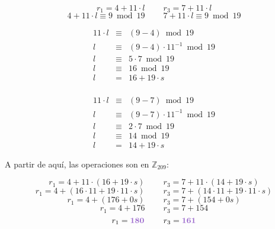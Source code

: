 \documentclass[10pt,spanish]{article}
\begin{document}
\begin{description}
    \begin{displaymath}
        r_1 = 4 + 11 \cdot l \qquad\ r_3 = 7 + 11 \cdot l
    \end{displaymath}
    \begin{displaymath}
        4 + 11 \cdot l \equiv 9 \bmod 19 \qquad\ 7 + 11 \cdot l \equiv 9 \bmod 19
    \end{displaymath}

    \begin{minipage}{0.5\textwidth}
    \begin{displaymath}
    \begin{matrix}
    11 \cdot l & \equiv & (9 - 4) \bmod 19 \\
    l & \equiv & (9 - 4) \cdot 11^{-1} \bmod 19\\
    l & \equiv & 5 \cdot 7 \bmod 19\\
    l & \equiv & 16 \bmod 19\\
    l & = & 16 + 19 \cdot s \\
    \end{matrix}     
    \end{displaymath}
    \end{minipage}
    \begin{minipage}{0.5\textwidth}
    \begin{displaymath}
    \begin{matrix}
    11 \cdot l & \equiv & (9 - 7) \bmod 19 \\
    l & \equiv & (9 - 7) \cdot 11^{-1} \bmod 19\\
    l & \equiv & 2 \cdot 7 \bmod 19\\
    l & \equiv & 14 \bmod 19\\
    l & = & 14 + 19 \cdot s
    \end{matrix}     
    \end{displaymath}
    \end{minipage}

    A partir de aquí, las operaciones son en $\mathbb{Z}_{209}$: 

    \begin{displaymath}
        r_1 = 4 + 11 \cdot (16 + 19 \cdot s) \qquad\ r_3 = 7 + 11 \cdot (14 + 19 \cdot s)
    \end{displaymath}
    \begin{displaymath}
        r_1 = 4 + (16 \cdot 11 + 19  \cdot 11 \cdot s) \qquad\ r_3 = 7 + (14 \cdot 11 + 19 \cdot 11 \cdot s)
    \end{displaymath}
    \begin{displaymath}
        r_1 = 4 + (176 + 0s) \qquad\ r_3 = 7 + (154 + 0s)
    \end{displaymath}
    \begin{displaymath}
        r_1 = 4 + 176 \qquad\ r_3 = 7 + 154
    \end{displaymath}
    \begin{displaymath}
        r_1 = \mathbf{\textcolor{morado}{180}} \qquad\ r_3 = \mathbf{\textcolor{morado}{161}}
    \end{displaymath}



\end{description}
\end{document}
